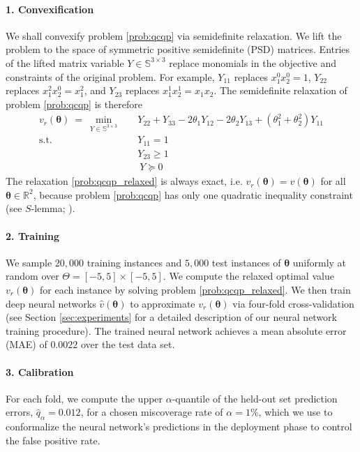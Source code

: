 \documentclass[10pt]{article} %
\theoremstyle{plain}
\theoremstyle{definition}
\theoremstyle{remark}
\begin{document}
\paragraph{1. Convexification} We shall convexify problem \cref{prob:qcqp} via semidefinite relaxation. We lift the problem to the space of symmetric positive semidefinite (PSD) matrices. Entries of the lifted matrix variable $Y \in \mathbb{S}^{3 \times 3}$ replace monomials in the objective and constraints of the original problem. For example, $Y_{11}$ replaces $x_1^0 x_2^0 = 1$, $Y_{22}$ replaces $x_1^2 x_2^0 = x_1^2$, and $Y_{23}$ replaces $x_1^1 x_2^1 = x_1 x_2$. The semidefinite relaxation of problem \cref{prob:qcqp} is therefore
\begin{equation}
\begin{aligned}
v_r(\bm{\theta}) ~=~ \min_{Y \in \mathbb{S}^{3 \times 3}} \quad 
&Y_{22} + Y_{33} - 2 \theta_1 Y_{12} - 2 \theta_2 Y_{13} + (\theta_1^2 + \theta_2^2) Y_{11} \\ 
\text{s.t.}\quad & Y_{11} = 1 \\[3pt]
& Y_{23} \geq 1 \\[4pt]
& ~Y \succeq 0
\end{aligned}
\label{prob:qcqp_relaxed}
\end{equation}
The relaxation \cref{prob:qcqp_relaxed} is always exact, i.e. $v_r(\bm{\theta}) = v(\bm{\theta})$ for all $\bm{\theta} \in \mathbb{R}^2$, because problem \cref{prob:qcqp}{}{} has only one quadratic inequality constraint (see $S$-lemma; \cite{boyd2004convex}). 

\paragraph{2. Training} We sample $20{,}000$ training instances and $5{,}000$ test instances of $\bm{\theta}$ uniformly at random over $\Theta = [-5,5] \times [-5,5]$. We compute the relaxed optimal value $v_r(\bm{\theta})$ for each instance by solving problem \cref{prob:qcqp_relaxed}{}{}. We then train deep neural networks $\hat{v}(\bm{\theta})$ to approximate $v_r(\bm{\theta})$ via four-fold cross-validation (see Section \ref{sec:experiments} for a detailed description of our neural network training procedure). The trained neural network achieves a mean absolute error (MAE) of $0.0022$ over the test data set.

\paragraph{3. Calibration} For each fold, we compute the upper $\alpha$-quantile of the held-out set prediction errors, $\hat{q}_\alpha = 0.012$, for a chosen miscoverage rate of $\alpha = 1\%$, which we use to conformalize the neural network's predictions in the deployment phase to control the false positive rate.
\end{document}
